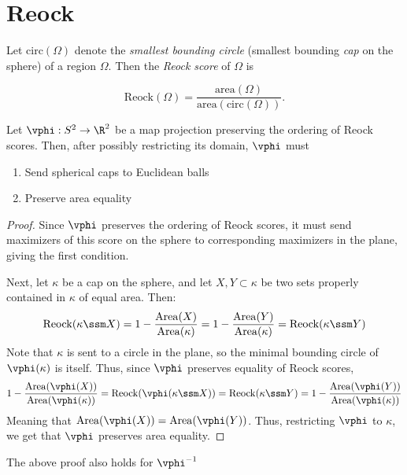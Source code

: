 \section{Reock}\label{sec:reock}
Let $\mathrm{circ}(\Omega)$ denote the \textit{smallest bounding
circle} (smallest bounding \textit{cap} on the sphere) of a region
$\Omega$.  Then the \textit{Reock score} of $\Omega$ is 

$$\mathrm{Reock}(\Omega)=
\frac{\mathrm{area}(\Omega)}{\mathrm{area}(\mathrm{circ}(\Omega))}.$$
\begin{lemma}
  Let $\vphi:S^2\to\R^2$ be a map projection preserving the 
  ordering of Reock scores. Then, after 
  possibly restricting its domain, $\vphi$ must
  \begin{enumerate}
    \item Send spherical caps to Euclidean balls
    \item Preserve area equality
  \end{enumerate}
\end{lemma}
\begin{proof}
  Since $\vphi$ preserves the ordering of Reock scores, it must 
  send maximizers of this score on the sphere to corresponding 
  maximizers in the plane, giving the first condition.

  Next, let $\kappa$ be a cap on the sphere, and let 
  $X,Y\subset \kappa$ be two sets properly contained in 
  $\kappa$ of equal area. Then:
  \begin{align*}
    \mathrm{Reock}(\kappa\ssm X) 
    = 1-\frac{\mathrm{Area}(X)}{\mathrm{Area}(\kappa)} 
    = 1-\frac{\mathrm{Area}(Y)}{\mathrm{Area}(\kappa)}
    = \mathrm{Reock}(\kappa\ssm Y)
  \end{align*}
  Note that $\kappa$ is sent to a circle in the plane, so 
  the minimal bounding circle of $\vphi(\kappa)$ is itself. Thus, 
  since $\vphi$ preserves equality of Reock scores,
  \begin{align*}
    1-\frac{\mathrm{Area}(\vphi(X))}{\mathrm{Area}(\vphi(\kappa))} 
    = \mathrm{Reock}(\vphi(\kappa\ssm X)) 
    = \mathrm{Reock}(\kappa\ssm Y)
    = 1-\frac{\mathrm{Area}(\vphi(Y))}{\mathrm{Area}(\vphi(\kappa))}
  \end{align*}
  Meaning that $\mathrm{Area}(\vphi(X)) = \mathrm{Area}(\vphi(Y))$. 
  Thus, restricting $\vphi$ to $\kappa$, we get that 
  $\vphi$ preserves area equality.
\end{proof}
\begin{remark}
  The above proof also holds for $\vphi^{-1}$
\end{remark}
